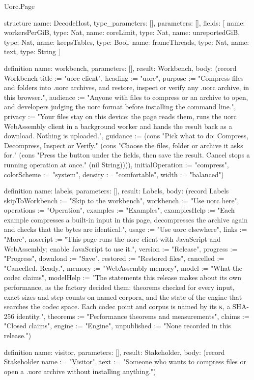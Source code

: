 \begin{lexlean}{Uorc.Page}
\begin{semanticmodule}
structure{
  name: DecodeHost,
  type_parameters: [],
  parameters: [],
  fields: [
    {name: workersPerGiB, type: Nat},
    {name: coreLimit, type: Nat},
    {name: unreportedGiB, type: Nat},
    {name: keepsTables, type: Bool},
    {name: frameThreads, type: Nat},
    {name: text, type: String}
  ]
}

definition{
  name: workbench,
  parameters: [],
  result: Workbench,
  body: (record Workbench {title := "uorc client", heading := "uorc", purpose := "Compress files and folders into .uorc archives, and restore, inspect or verify any .uorc archive, in this browser.", audience := "Anyone with files to compress or an archive to open, and developers judging the uorc format before installing the command line.", privacy := "Your files stay on this device: the page reads them, runs the uorc WebAssembly client in a background worker and hands the result back as a download. Nothing is uploaded.", guidance := (cons "Pick what to do: Compress, Decompress, Inspect or Verify." (cons "Choose the files, folder or archive it asks for." (cons "Press the button under the fields, then save the result. Cancel stops a running operation at once." (nil String)))), initialOperation := "compress", colorScheme := "system", density := "comfortable", width := "balanced"})
}

definition{
  name: labels,
  parameters: [],
  result: Labels,
  body: (record Labels {skipToWorkbench := "Skip to the workbench", workbench := "Use uorc here", operations := "Operation", examples := "Examples", examplesHelp := "Each example compresses a built-in input in this page, decompresses the archive again and checks that the bytes are identical.", usage := "Use uorc elsewhere", links := "More", noscript := "This page runs the uorc client with JavaScript and WebAssembly; enable JavaScript to use it.", version := "Release", progress := "Progress", download := "Save", restored := "Restored files", cancelled := "Cancelled. Ready.", memory := "WebAssembly memory", model := "What the codec claims", modelHelp := "The statements this release makes about its own performance, as the factory decided them: theorems checked for every input, exact sizes and step counts on named corpora, and the state of the engine that searches the codec space. Each codec point and corpus is named by its κ, a SHA-256 identity.", theorems := "Performance theorems and measurements", claims := "Closed claims", engine := "Engine", unpublished := "None recorded in this release."})
}

definition{
  name: visitor,
  parameters: [],
  result: Stakeholder,
  body: (record Stakeholder {name := "Visitor", text := "Someone who wants to compress files or open a .uorc archive without installing anything."})
}


\end{semanticmodule}
\end{lexlean}

